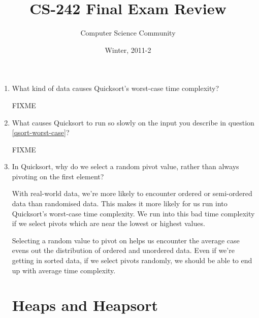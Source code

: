 \documentclass[11pt]{article}
\author{Computer Science Community}
\title{CS-242 Final Exam Review}
\date{Winter, 2011-2}
\makeatletter
\newenvironment{answer}{\large\lstset{basicstyle=\large}\color{white}}{}
\newenvironment{answer}{\large\lstset{basicstyle=\large}\color{red}}{}
\let\thetitle\@title
\let\thedate\@date
\makeatother
\begin{document}
\noindent{\Large \thetitle \hfill \thedate}

\begin{enumerate}
\section*{Backtracking}
\section*{Hashing and Hash Tables}
\section*{Sorting}

\item\label{qsort-worst-case} What kind of data causes Quicksort's worst-case
      time complexity?

      \begin{answer}
      {\huge FIXME}
      \end{answer}

\item What causes Quicksort to run so slowly on the input you describe in
      question \ref{qsort-worst-case}?

    \begin{answer}
    {\huge FIXME}
    \end{answer}

\item In Quicksort, why do we select a random pivot value, rather than always
      pivoting on the first element?

      \begin{answer}
      With real-world data, we're more likely to encounter ordered or
      semi-ordered data than randomised data. This makes it more likely for us
      run into Quicksort's worst-case time complexity. We run into this bad
      time complexity if we select pivots which are near the lowest or highest
      values.

      Selecting a random value to pivot on helps us encounter the average case
      evens out the distribution of ordered and unordered data. Even if we're
      getting in sorted data, if we select pivots randomly, we should be able
      to end up with average time complexity.
      \end{answer}

\section*{Heaps and Heapsort}


\end{enumerate}
\end{document}
